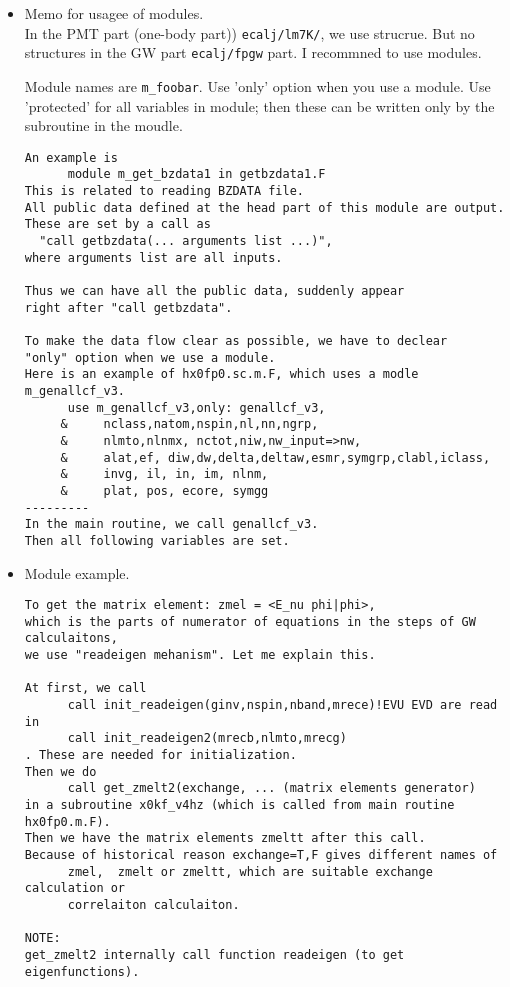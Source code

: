 \documentclass[a4paper,10pt,fleqn]{article}
\begin{document}
\begin{itemize}
\item Memo for usagee of modules. \\
In the PMT part (one-body part)) \verb#ecalj/lm7K/#, we use strucrue. But no
       structures in the GW part \verb#ecalj/fpgw# part. I recommned to
       use modules.

       Module names are \verb#m_foobar#. Use 'only' option when you use
       a module. Use 'protected' for all variables in module; then these
        can be written only by the subroutine in the moudle.

\begin{verbatim}
An example is 
      module m_get_bzdata1 in getbzdata1.F
This is related to reading BZDATA file.
All public data defined at the head part of this module are output.
These are set by a call as
  "call getbzdata(... arguments list ...)",
where arguments list are all inputs.

Thus we can have all the public data, suddenly appear
right after "call getbzdata". 

To make the data flow clear as possible, we have to declear 
"only" option when we use a module.
Here is an example of hx0fp0.sc.m.F, which uses a modle m_genallcf_v3.
      use m_genallcf_v3,only: genallcf_v3,
     &     nclass,natom,nspin,nl,nn,ngrp,
     &     nlmto,nlnmx, nctot,niw,nw_input=>nw,
     &     alat,ef, diw,dw,delta,deltaw,esmr,symgrp,clabl,iclass,
     &     invg, il, in, im, nlnm, 
     &     plat, pos, ecore, symgg 
---------
In the main routine, we call genallcf_v3.
Then all following variables are set.
\end{verbatim}

 \item Module example.
\begin{verbatim}
To get the matrix element: zmel = <E_nu phi|phi>,
which is the parts of numerator of equations in the steps of GW calculaitons,
we use "readeigen mehanism". Let me explain this.

At first, we call
      call init_readeigen(ginv,nspin,nband,mrece)!EVU EVD are read in 
      call init_readeigen2(mrecb,nlmto,mrecg)
. These are needed for initialization. 
Then we do
      call get_zmelt2(exchange, ... (matrix elements generator)
in a subroutine x0kf_v4hz (which is called from main routine hx0fp0.m.F).
Then we have the matrix elements zmeltt after this call.
Because of historical reason exchange=T,F gives different names of
      zmel,  zmelt or zmeltt, which are suitable exchange calculation or
      correlaiton calculaiton.

NOTE:
get_zmelt2 internally call function readeigen (to get eigenfunctions).
\end{verbatim}
\end{itemize}
\end{document}
